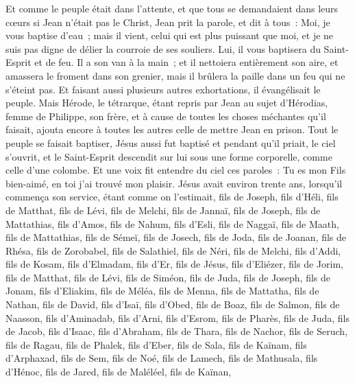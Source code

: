 \begin{multicols}{2}
Et comme le peuple était dans l'attente, et que tous se demandaient dans leurs cœurs si Jean n'était pas le Christ,
Jean prit la parole, et dit à tous~: Moi, je vous baptise d'eau~; mais il vient, celui qui est plus puissant que moi, et je ne suis pas digne de délier la courroie de ses souliers. Lui, il vous baptisera du Saint-Esprit et de feu.
Il a son van à la main~; et il nettoiera entièrement son aire, et amassera le froment dans son grenier, mais il brûlera la paille dans un feu qui ne s'éteint pas.
Et faisant aussi plusieurs autres exhortations, il évangélisait le peuple.
Mais Hérode, le tétrarque, étant repris par Jean au sujet d'Hérodias, femme de Philippe, son frère, et à cause de toutes les choses méchantes qu'il faisait,
ajouta encore à toutes les autres celle de mettre Jean en prison.
Tout le peuple se faisait baptiser, Jésus aussi fut baptisé et pendant qu'il priait, le ciel s'ouvrit,
et le Saint-Esprit descendit sur lui sous une forme corporelle, comme celle d'une colombe. Et une voix fit entendre du ciel ces paroles~: Tu es mon Fils bien-aimé, en toi j'ai trouvé mon plaisir.
Jésus avait environ trente ans, lorsqu'il commença son service, étant comme on l'estimait, fils de Joseph, fils d'Héli,
fils de Matthat, fils de Lévi, fils de Melchi, fils de Jannaï, fils de Joseph,
fils de Mattathias, fils d'Amos, fils de Nahum, fils d'Esli, fils de Naggaï,
fils de Maath, fils de Mattathias, fils de Sémeï, fils de Josech, fils de Joda,
fils de Joanan, fils de Rhésa, fils de Zorobabel, fils de Salathiel, fils de Néri,
fils de Melchi, fils d'Addi, fils de Kosam, fils d'Elmadam, fils d'Er,
fils de Jésus, fils d'Eliézer, fils de Jorim, fils de Matthat, fils de Lévi,
fils de Siméon, fils de Juda, fils de Joseph, fils de Jonam, fils d'Eliakim,
fils de Méléa, fils de Menna, fils de Mattatha, fils de Nathan, fils de David,
fils d'Isaï, fils d'Obed, fils de Boaz, fils de Salmon, fils de Naasson,
fils d'Aminadab, fils d'Arni, fils d'Esrom, fils de Pharès, fils de Juda,
fils de Jacob, fils d'Isaac, fils d'Abraham, fils de Thara, fils de Nachor,
fils de Seruch, fils de Ragau, fils de Phalek, fils d'Eber, fils de Sala,
fils de Kaïnam, fils d'Arphaxad, fils de Sem, fils de Noé, fils de Lamech,
fils de Mathusala, fils d'Hénoc, fils de Jared, fils de Maléléel, fils de Kaïnan,

\end{multicols}
